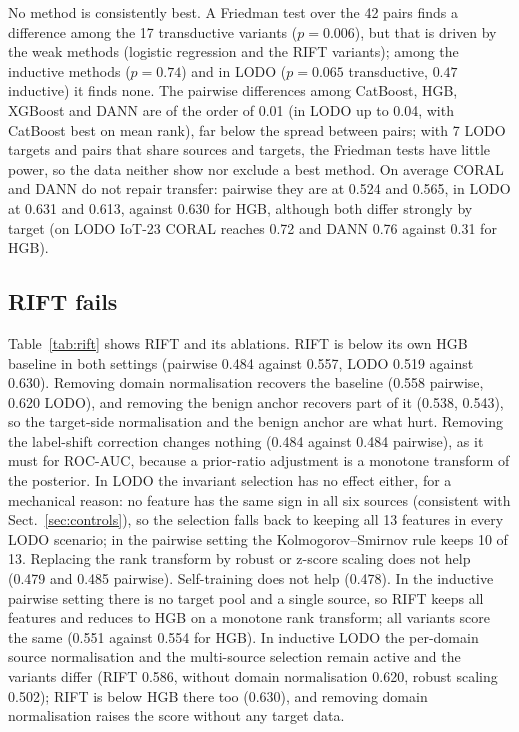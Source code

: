 \documentclass[11pt]{article}
\begin{document}
No method is consistently best.
A Friedman test over the 42 pairs finds a difference among the 17 transductive variants ($p=0.006$), but that is driven by the weak methods (logistic regression and the RIFT variants); among the inductive methods ($p=0.74$) and in LODO ($p=0.065$ transductive, $0.47$ inductive) it finds none.
The pairwise differences among CatBoost, HGB, XGBoost and DANN are of the order of 0.01 (in LODO up to 0.04, with CatBoost best on mean rank), far below the spread between pairs; with 7 LODO targets and pairs that share sources and targets, the Friedman tests have little power, so the data neither show nor exclude a best method.
On average CORAL and DANN do not repair transfer: pairwise they are at 0.524 and 0.565, in LODO at 0.631 and 0.613, against 0.630 for HGB, although both differ strongly by target (on LODO IoT-23 CORAL reaches 0.72 and DANN 0.76 against 0.31 for HGB).

\subsection{RIFT fails}
Table~\ref{tab:rift} shows RIFT and its ablations.
RIFT is below its own HGB baseline in both settings (pairwise 0.484 against 0.557, LODO 0.519 against 0.630).
Removing domain normalisation recovers the baseline (0.558 pairwise, 0.620 LODO), and removing the benign anchor recovers part of it (0.538, 0.543), so the target-side normalisation and the benign anchor are what hurt.
Removing the label-shift correction changes nothing (0.484 against 0.484 pairwise), as it must for ROC-AUC, because a prior-ratio adjustment is a monotone transform of the posterior.
In LODO the invariant selection has no effect either, for a mechanical reason: no feature has the same sign in all six sources (consistent with Sect.~\ref{sec:controls}), so the selection falls back to keeping all 13 features in every LODO scenario; in the pairwise setting the Kolmogorov--Smirnov rule keeps 10 of 13.
Replacing the rank transform by robust or z-score scaling does not help (0.479 and 0.485 pairwise).
Self-training does not help (0.478).
In the inductive pairwise setting there is no target pool and a single source, so RIFT keeps all features and reduces to HGB on a monotone rank transform; all variants score the same (0.551 against 0.554 for HGB).
In inductive LODO the per-domain source normalisation and the multi-source selection remain active and the variants differ (RIFT 0.586, without domain normalisation 0.620, robust scaling 0.502); RIFT is below HGB there too (0.630), and removing domain normalisation raises the score without any target data.
\end{document}
